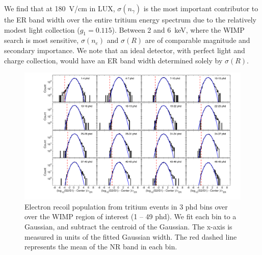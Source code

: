 
We find that at 180~V/cm in LUX, $ \sigma(n_{\gamma})$ is the most important contributor to the ER band width over the entire tritium energy spectrum due to the relatively modest light collection ($g_1 = 0.115$). Between 2 and 6~keV, where the WIMP search is most sensitive, $ \sigma(n_e)$ and $ \sigma(R)$ are of comparable magnitude and secondary importance. We note that an ideal detector, with perfect light and charge collection, would have an ER band width determined solely by $ \sigma(R)$. 


\onecolumngrid
\break
\begin{figure}[t!]
\includegraphics[width=140mm]{fig13.pdf}
\caption{Electron recoil population from tritium events in 3 phd bins over over the WIMP region of interest (1 -- 49 phd). We fit each bin to a Gaussian, and subtract the centroid of the Gaussian. The x-axis is measured in units of the fitted Gaussian width. The red dashed line represents the mean of the NR band in each bin. }
\label{fig:ER-Gauss}
\end{figure}
\twocolumngrid


